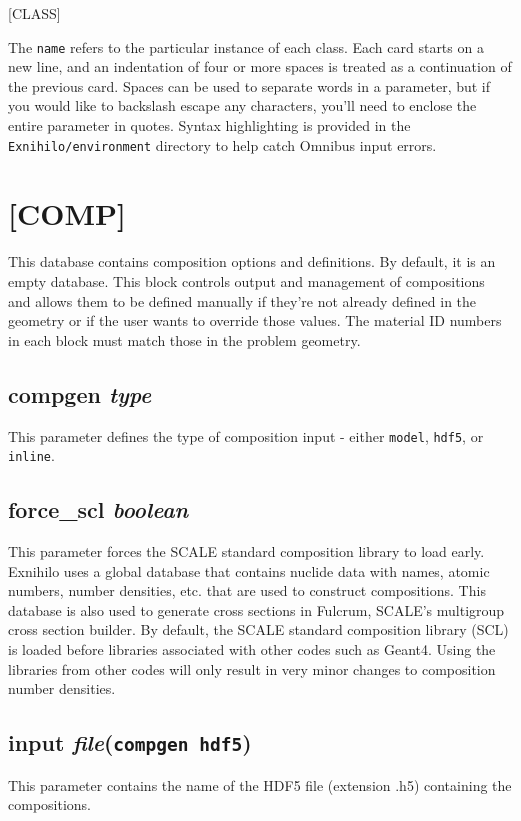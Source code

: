 \documentclass[10pt]{article}
\begin{document}
[CLASS]\newline
[CLASS=type]\newline
[PARENT][CLASS=type name]\newline

The \texttt{name} refers to the particular instance of each class. Each card starts on a new line, and an indentation of four or more spaces is treated as a continuation of the previous card. Spaces can be used to separate words in a parameter, but if you would like to backslash escape any characters, you'll need to enclose the entire parameter in quotes. Syntax highlighting is provided in the \texttt{Exnihilo/environment} directory to help catch Omnibus input errors.

\section{[COMP]}
This database contains composition options and definitions. By default, it is an empty database. This block controls output and management of compositions and allows them to be defined manually if they're not already defined in the geometry or if the user wants to override those values. The material ID numbers in each block must match those in the problem geometry.

\subsection{compgen \textit{type}}
This parameter defines the type of composition input - either \texttt{model}, \texttt{hdf5}, or \texttt{inline}.

\subsection{force\_scl \textit{boolean}}
This parameter forces the SCALE standard composition library to load early. Exnihilo uses a global database that contains nuclide data with names, atomic numbers, number densities, etc. that are used to construct compositions. This database is also used to generate cross sections in Fulcrum, SCALE's multigroup cross section builder. By default, the SCALE standard composition library (SCL) is loaded before libraries associated with other codes such as Geant4. Using the libraries from other codes will only result in very minor changes to composition number densities.

\subsection{input \textit{file}\quad\quad\quad(\texttt{compgen hdf5})}
This parameter contains the name of the HDF5 file (extension .h5) containing the compositions. 
\end{document}
